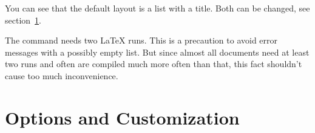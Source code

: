 \documentclass[DIV10,toc=index,toc=bib,hyperfootnotes=false]{cnpkgdoc}
\begin{document}
\printacronyms[include-classes=city,name={City Acronyms}]

You can see that the default layout is a  list with a
 title. Both can be changed, see section~\ref{sec:customization}.

The command  needs two \LaTeX{} runs. This is a precaution to
avoid error messages with a possibly empty list. But since almost all documents
need at least two runs and often are compiled much more often than that, this
fact shouldn't cause too much inconvenience.

\section{Options and Customization}\label{sec:customization}
\end{document}
